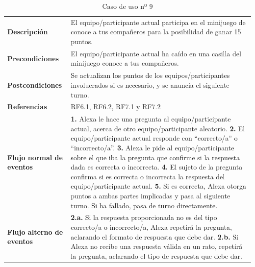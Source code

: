 \begin{table}[H]
	\centering
	\begin{tabular}{|p{3cm}|p{12cm}|}
		\hline
		\rowcolor{lightgray}
		\multicolumn{2}{|c|}{\textbf{CU09}: Minijuego conoce a tus compañeros} \\
		\hline
		\textbf{Descripción} & El equipo/participante actual participa en el minijuego de conoce a tus compañeros para la posibilidad de ganar 15 puntos. \vspace{0.2cm} \\
		\hline
		\textbf{Precondiciones} & El equipo/participante actual ha caído en una casilla del minijuego conoce a tus compañeros. \vspace{0.2cm} \\
		\hline
		\textbf{Postcondiciones} & Se actualizan los puntos de los equipos/participantes involucrados si es necesario, y se anuncia el siguiente turno. \vspace{0.2cm} \\
		\hline
		\textbf{Referencias} & RF6.1, RF6.2, RF7.1 y RF7.2 \vspace{0.2cm} \\
		\hline
		\textbf{Flujo normal de eventos} &
		\textbf{1.} Alexa le hace una pregunta al equipo/participante actual, acerca de otro equipo/participante aleatorio. \newline
		\vspace{0.2cm}
		\textbf{2.} El equipo/participante actual responde con \enquote{correcto/a} o \enquote{incorrecto/a}. \newline
		\vspace{0.2cm}
		\textbf{3.} Alexa le pide al equipo/participante sobre el que iba la pregunta que confirme si la respuesta dada es correcta o incorrecta. \newline
		\vspace{0.2cm} 
		\textbf{4.} El sujeto de la pregunta confirma si es correcta o incorrecta la respuesta del equipo/participante actual. \newline
		\vspace{0.2cm} 
		\textbf{5.} Si es correcta, Alexa otorga puntos a ambas partes implicadas y pasa al siguiente turno. Si ha fallado, pasa de turno directamente.
		\vspace{0.2cm} \\
		\hline
		\textbf{Flujo alterno de eventos} &
		\textbf{2.a.} Si la respuesta proporcionada no es del tipo correcto/a o incorrecto/a, Alexa repetirá la pregunta, aclarando el formato de respuesta que debe dar. \newline
		\vspace{0.2cm} 
		\textbf{2.b.} Si Alexa no recibe una respuesta válida en un rato, repetirá la pregunta, aclarando el tipo de respuesta que debe dar. \vspace{0.2cm} \\
		\hline
	\end{tabular}
	\caption{Caso de uso nº 9}
	\label{tab:CU09}
\end{table}

